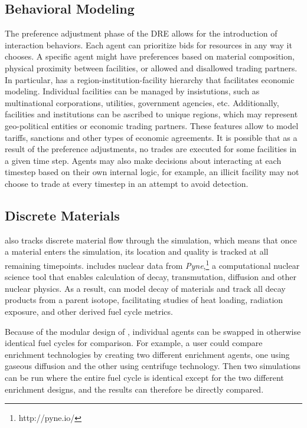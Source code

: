 \subsection{Behavioral Modeling}
The preference adjustment phase of the \gls{DRE} allows for the introduction of interaction behaviors.  Each agent can prioritize bids for resources in any way it chooses. A specific agent might have preferences based on material composition, physical proximity between facilities, or allowed and disallowed trading partners. In particular, \Cyclus has a region-institution-facility hierarchy that facilitates economic modeling\cite{oliver_geniusv2:_2009}.  Individual facilities can be managed by insistutions, such as multinational corporations, utilities, government agencies, etc.  Additionally, facilities and institutions can be ascribed to unique regions, which may represent geo-political entities or economic trading partners. These features allow \Cyclus to model tariffs, sanctions and other types of economic agreements.  It is possible that as a result of the preference adjustments, no trades are executed for some facilities in a given time step.  Agents may also make decisions about interacting at each timestep based on their own internal logic, for example, an illicit facility may not choose to trade at every timestep in an attempt to avoid detection. 

\subsection{Discrete Materials}
\Cyclus also tracks discrete material flow through the simulation, which means that once a material enters the simulation, its location and quality is tracked at all remaining timepoints\cite{huff_integrated:_2013}.  \Cyclus includes nuclear data from \emph{Pyne},\footnote{http://pyne.io/} a computational nuclear science tool that enables calculation of decay, transmutation, diffusion and other nuclear physics\cite{Scopatz2012b}. As a result, \Cyclus can  model decay of materials and track all decay products from a parent isotope, facilitating studies of heat loading, radiation exposure, and other derived fuel cycle metrics\cite{scopatz_cymetric_2015}.

Because of the modular design of \Cyclus, individual agents can be swapped in otherwise identical fuel cycles for comparison. For example, a user could compare enrichment technologies by creating two different enrichment agents, one using gaseous diffusion and the other using centrifuge technology. Then two simulations can be run where the entire fuel cycle is identical except for the two different enrichment designs, and the results can therefore be directly compared.
